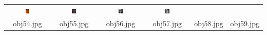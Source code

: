 \begin{table}[H]
\begin{tabu}{|cccccc|}
    \includegraphics[width=0.1\textwidth,height=0.1\textwidth]{imagens/coil_100/chicaras/obj59__0_1.png} &
    \includegraphics[width=0.1\textwidth,height=0.1\textwidth]{imagens/coil_100/chicaras/obj81__0.png} &
    \includegraphics[width=0.1\textwidth,height=0.1\textwidth]{imagens/coil_100/chicaras/obj89__0.png} &
    \includegraphics[width=0.1\textwidth,height=0.1\textwidth]{imagens/coil_100/chicaras/obj97__0.png}
    \\
    \scriptsize{obj54.jpg} & \scriptsize{obj55.jpg} & \scriptsize{obj56.jpg} &
    \scriptsize{obj57.jpg} & \scriptsize{obj58.jpg} & \scriptsize{obj59.jpg}
  \end{tabu}
\end{table}

